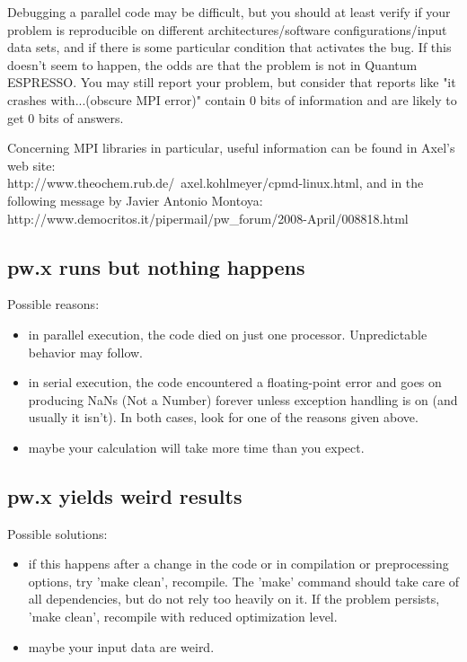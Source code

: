 \documentclass[12pt,a4paper]{article}
\def\qe{{\sc Quantum ESPRESSO}}
\begin{document}
Debugging a parallel code may be difficult, but you should at least
verify if your problem is reproducible on different
architectures/software configurations/input data sets, and if  
there is some particular condition that activates the bug. If this
doesn't seem to happen, the odds are that the problem is not in
\qe. You may still report your problem, 
but consider that reports like "it crashes with...(obscure MPI error)"
contain 0 bits of information and are likely to get 0 bits of answers.

Concerning MPI libraries in particular, useful information can be
found in Axel's web site: \\
http://www.theochem.rub.de/~axel.kohlmeyer/cpmd-linux.html, and in the
following message by Javier Antonio Montoya: \\
http://www.democritos.it/pipermail/pw\_forum/2008-April/008818.html

\subsection{pw.x runs but nothing happens}
Possible reasons:
\begin{itemize}
\item in parallel execution, the code died on just one
  processor. Unpredictable behavior may follow. 
\item in serial execution, the code encountered a floating-point error
  and goes on producing NaNs (Not a Number) forever unless exception
  handling is on (and usually it isn't). In both cases, look for one
  of the reasons given above. 
\item maybe your calculation will take more time than you expect.
\end{itemize}

\subsection{pw.x yields weird results}
Possible solutions:
\begin{itemize}
\item if this happens after a change in the code or in compilation or
  preprocessing options, try 'make clean', recompile. The 'make'
  command should take care of all dependencies, but do not rely too
  heavily on it. If the problem persists, 'make clean', recompile with
  reduced optimization level.  
\item maybe your input data are weird.
\end{itemize}
\end{document}
